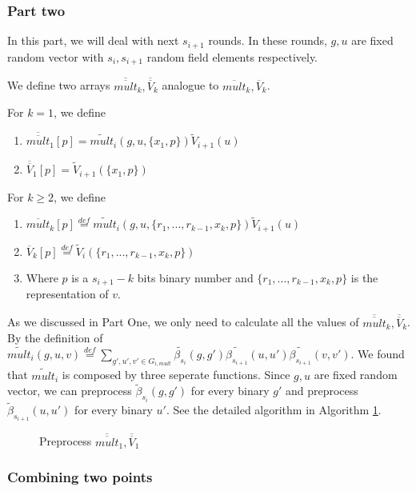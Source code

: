 \subsubsection{Part two}
In this part, we will deal with next $s_{i+1}$ rounds. In these rounds, $g, u$ are fixed random vector with $s_{i}, s_{i+1}$ random field elements respectively.

We define two arrays $\overline{\overline{mult}}_k, \overline{\overline{V}}_k$ analogue to $\overline{mult}_k, \overline{V}_k$.

\begin{definition}
	For $k=1$, we define 
	\begin{enumerate}
		\item $\overline{\overline{mult}}_1[p] = \tilde{mult}_i(g, u, \{x_1, p\})\tilde{V}_{i+1}(u)$
		\item $\overline{\overline{V}}_1[p] = \tilde{V}_{i+1}(\{x_1, p\})$
	\end{enumerate}
	For $k\ge 2$, we define
	\begin{enumerate}
		\item $\overline{mult}_k[p]\overset{def}{=}\tilde{mult}_i(g, u, \{r_1, ..., r_{k-1}, x_k, p\})\tilde{V}_{i+1}(u)$
		\item $\overline{V}_k[p]\overset{def}{=}\tilde{V}_i(\{r_1, ..., r_{k-1}, x_k, p\})$
		\item Where $p$ is a $s_{i+1}-k$ bits binary number and $\{r_1, ..., r_{k-1}, x_k, p\}$ is the representation of $v$.
	\end{enumerate}
\end{definition}

As we discussed in Part One, we only need to calculate all the values of $\overline{\overline{mult}}_k, \overline{\overline{V}}_k$. By the definition of $\tilde{mult}_i(g, u, v)\overset{def}{=}\sum_{g', u', v' \in G_{i, mult}}\tilde{\beta_{s_i}}(g, g')\tilde{\beta_{s_{i+1}}}(u, u')\tilde{\beta_{s_{i+1}}}(v, v')$. We found that $\tilde{mult}_i$ is composed by three seperate functions. Since $g, u$ are fixed random vector, we can preprocess $\tilde{\beta}_{s_i}(g, g')$ for every binary $g'$ and preprocess $\tilde{\beta}_{s_{i+1}}(u, u')$ for every binary $u'$. See the detailed algorithm in Algorithm \ref{alg::parttwo}.

\begin{figure}[p]
\begin{algorithm}[H]
\label{alg::parttwo}
\caption{Preprocess $\overline{\overline{mult}}_1, \overline{\overline{V}}_1$}
\begin{algorithmic}[1]
\EndProcedure
{}
\EndProcedure
{}
\EndProcedure
\end{algorithmic}
\end{algorithm}
\end{figure}

\subsubsection{Combining two points}